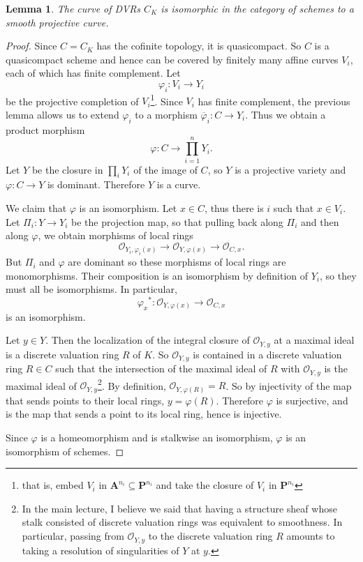 \documentclass[reqno,12pt,letterpaper]{amsart}
\newcommand{\PP}{\mathbf P}
\newcommand{\Aff}{\mathbf A}
\newcommand{\Olo}{\mathscr O}
\newtheorem{lemma}[theorem]{Lemma}
\theoremstyle{definition}
\begin{document}
\begin{lemma}
The curve of DVRs $C_K$ is isomorphic in the category of schemes to a smooth projective curve.
\end{lemma}
\begin{proof}
Since $C = C_K$ has the cofinite topology, it is quasicompact.
So $C$ is a quasicompact scheme and hence can be covered by finitely many affine curves $V_i$, each of which has finite complement.
Let
$$\varphi_i: V_i \to Y_i$$
be the projective completion of $V_i$\footnote{that is, embed $V_i$ in $\Aff^{n_i} \subseteq \PP^{n_i}$ and take the closure of $V_i$ in $\PP^{n_i}$}.
Since $V_i$ has finite complement, the previous lemma allows us to extend $\varphi_i$ to a morphism $\overline \varphi_i: C \to Y_i$.
Thus we obtain a product morphism
$$\varphi: C \to \prod_{i=1}^n Y_i.$$
Let $Y$ be the closure in $\prod_i Y_i$ of the image of $C$, so $Y$ is a projective variety and $\varphi: C \to Y$ is dominant.
Therefore $Y$ is a curve.

We claim that $\varphi$ is an isomorphism.
Let $x \in C$, thus there is $i$ such that $x \in V_i$. Let $\Pi_i: Y \to Y_i$ be the projection map, so that pulling back along $\Pi_i$ and then along $\varphi$, we obtain morphisms of local rings
$$\Olo_{Y_i, \varphi_i(x)} \to \Olo_{Y, \varphi(x)} \to \Olo_{C, x}.$$
But $\Pi_i$ and $\varphi$ are dominant so these morphisms of local rings are monomorphisms.
Their composition is an isomorphism by definition of $Y_i$, so they must all be isomorphisms.
In particular,
$${\varphi_x}^* : \Olo_{Y, \varphi(x)} \to \Olo_{C, x}$$
is an isomorphism.

Let $y \in Y$. Then the localization of the integral closure of $\Olo_{Y, y}$ at a maximal ideal is a discrete valuation ring $R$ of $K$.
So $\Olo_{Y, y}$ is contained in a discrete valuation ring $R \in C$ such that the intersection of the maximal ideal of $R$ with $\Olo_{Y, y}$ is the maximal ideal of $\Olo_{Y, y}$\footnote{In the main lecture,
I believe we said that having a structure sheaf whose stalk consisted of discrete valuation rings was equivalent to smoothness.
In particular, passing from $\Olo_{Y, y}$ to the discrete valuation ring $R$ amounts to taking a resolution of singularities of $Y$ at $y$.}.
By definition, $\Olo_{Y, \varphi(R)} = R$. So by injectivity of the map that sends points to their local rings, $y = \varphi(R)$.
Therefore $\varphi$ is surjective, and is the map that sends a point to its local ring, hence is injective.

Since $\varphi$ is a homeomorphism and is stalkwise an isomorphism, $\varphi$ is an isomorphism of schemes.
\end{proof}
\end{document}
